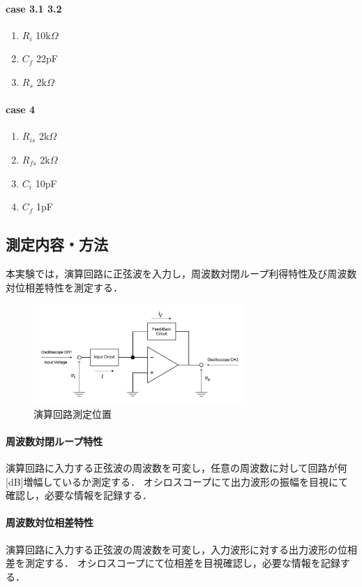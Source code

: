 \documentclass[dvipdfmx,titlepage,a4j]{jsarticle}  %
\begin{document}
\paragraph{case 3.1 3.2}
\begin{enumerate}
  \item $R_i$ 10k$\Omega$
  \item $C_{f}$ 22pF
  \item $R_s$ 2k$\Omega$
\end{enumerate}

\paragraph{case 4}
\begin{enumerate}
  \item $R_{is}$ 2k$\Omega$
  \item $R_{fs}$ 2k$\Omega$
  \item $C_{i}$ 10pF
  \item $C_{f}$ 1pF
\end{enumerate}

\subsection{測定内容・方法}
本実験では，演算回路に正弦波を入力し，周波数対閉ループ利得特性及び周波数対位相差特性を測定する．

\begin{figure}[H]
  \begin{center}
      \includegraphics[width=8cm]{../image/dia-o.png}
      \caption{演算回路測定位置}
      \label{fig:di:o}
  \end{center}
\end{figure}
\paragraph{周波数対閉ループ特性}
演算回路に入力する正弦波の周波数を可変し，任意の周波数に対して回路が何[dB]増幅しているか測定する．
オシロスコープにて出力波形の振幅を目視にて確認し，必要な情報を記録する．

\paragraph{周波数対位相差特性}
演算回路に入力する正弦波の周波数を可変し，入力波形に対する出力波形の位相差を測定する．
オシロスコープにて位相差を目視確認し，必要な情報を記録する．
\end{document}

